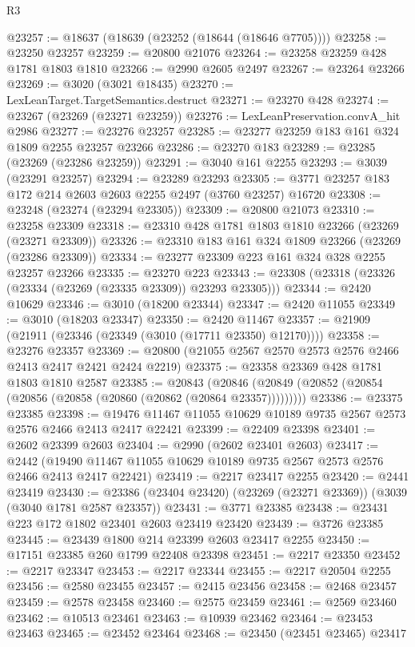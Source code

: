 \begin{lexlean}{R3}
\begin{coremodule}
@23257 := @18637 (@18639 (@23252 (@18644 (@18646 @7705))))
@23258 := @23250 @23257
@23259 := @20800 @21076
@23264 := @23258 @23259 @428 @1781 @1803 @1810
@23266 := @2990 @2605 @2497
@23267 := @23264 @23266
@23269 := @3020 (@3021 @18435)
@23270 := LexLeanTarget.TargetSemantics.destruct
@23271 := @23270 @428
@23274 := @23267 (@23269 (@23271 @23259))
@23276 := LexLeanPreservation.convA_hit @2986
@23277 := @23276 @23257
@23285 := @23277 @23259 @183 @161 @324 @1809 @2255 @23257 @23266
@23286 := @23270 @183
@23289 := @23285 (@23269 (@23286 @23259))
@23291 := @3040 @161 @2255
@23293 := @3039 (@23291 @23257)
@23294 := @23289 @23293
@23305 := @3771 @23257 @183 @172 @214 @2603 @2603 @2255 @2497 (@3760 @23257) @16720
@23308 := @23248 (@23274 (@23294 @23305))
@23309 := @20800 @21073
@23310 := @23258 @23309
@23318 := @23310 @428 @1781 @1803 @1810 @23266 (@23269 (@23271 @23309))
@23326 := @23310 @183 @161 @324 @1809 @23266 (@23269 (@23286 @23309))
@23334 := @23277 @23309 @223 @161 @324 @328 @2255 @23257 @23266
@23335 := @23270 @223
@23343 := @23308 (@23318 (@23326 (@23334 (@23269 (@23335 @23309)) @23293 @23305)))
@23344 := @2420 @10629
@23346 := @3010 (@18200 @23344)
@23347 := @2420 @11055
@23349 := @3010 (@18203 @23347)
@23350 := @2420 @11467
@23357 := @21909 (@21911 (@23346 (@23349 (@3010 (@17711 @23350) @12170))))
@23358 := @23276 @23357
@23369 := @20800 (@21055 @2567 @2570 @2573 @2576 @2466 @2413 @2417 @2421 @2424 @2219)
@23375 := @23358 @23369 @428 @1781 @1803 @1810 @2587
@23385 := @20843
    (@20846 (@20849 (@20852 (@20854 (@20856 (@20858 (@20860 (@20862 (@20864 @23357)))))))))
@23386 := @23375 @23385
@23398 := @19476 @11467 @11055 @10629 @10189 @9735 @2567 @2573 @2576 @2466 @2413 @2417 @22421
@23399 := @22409 @23398
@23401 := @2602 @23399 @2603
@23404 := @2990 (@2602 @23401 @2603)
@23417 := @2442
    (@19490 @11467 @11055 @10629 @10189 @9735 @2567 @2573 @2576 @2466 @2413 @2417 @22421)
@23419 := @2217 @23417 @2255
@23420 := @2441 @23419
@23430 := @23386 (@23404 @23420) (@23269 (@23271 @23369)) (@3039 (@3040 @1781 @2587 @23357))
@23431 := @3771 @23385
@23438 := @23431 @223 @172 @1802 @23401 @2603 @23419 @23420
@23439 := @3726 @23385
@23445 := @23439 @1800 @214 @23399 @2603 @23417 @2255
@23450 := @17151 @23385 @260 @1799 @22408 @23398
@23451 := @2217 @23350
@23452 := @2217 @23347
@23453 := @2217 @23344
@23455 := @2217 @20504 @2255
@23456 := @2580 @23455
@23457 := @2415 @23456
@23458 := @2468 @23457
@23459 := @2578 @23458
@23460 := @2575 @23459
@23461 := @2569 @23460
@23462 := @10513 @23461
@23463 := @10939 @23462
@23464 := @23453 @23463
@23465 := @23452 @23464
@23468 := @23450 (@23451 @23465) @23417

\end{coremodule}
\end{lexlean}
